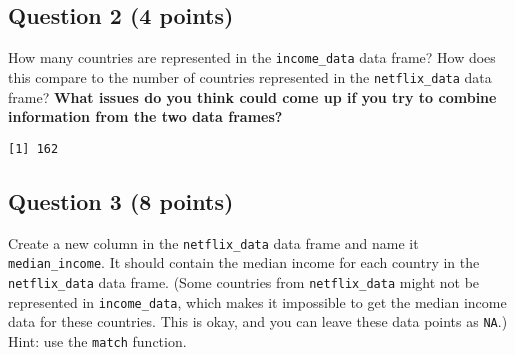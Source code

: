 \documentclass[
]{article}
\newenvironment{Shaded}{\begin{snugshade}}{\end{snugshade}}
\newcommand{\FunctionTok}[1]{\textcolor[rgb]{0.13,0.29,0.53}{\textbf{#1}}}
\newcommand{\NormalTok}[1]{#1}
\newcommand{\OtherTok}[1]{\textcolor[rgb]{0.56,0.35,0.01}{#1}}
\newcommand{\SpecialCharTok}[1]{\textcolor[rgb]{0.81,0.36,0.00}{\textbf{#1}}}
\begin{document}
\subsection{Question 2 (4 points)}\label{question-2-4-points-1}

How many countries are represented in the \texttt{income\_data} data
frame? How does this compare to the number of countries represented in
the \texttt{netflix\_data} data frame? \textbf{What issues do you think
could come up if you try to combine information from the two data
frames?}

\begin{Shaded}
\end{Shaded}

\begin{verbatim}
[1] 162
\end{verbatim}

\subsection{Question 3 (8 points)}\label{question-3-8-points}

Create a new column in the \texttt{netflix\_data} data frame and name it
\texttt{median\_income}. It should contain the median income for each
country in the \texttt{netflix\_data} data frame. (Some countries from
\texttt{netflix\_data} might not be represented in
\texttt{income\_data}, which makes it impossible to get the median
income data for these countries. This is okay, and you can leave these
data points as \texttt{NA}.) Hint: use the \texttt{match} function.

\begin{Shaded}
\end{Shaded}
\end{document}

